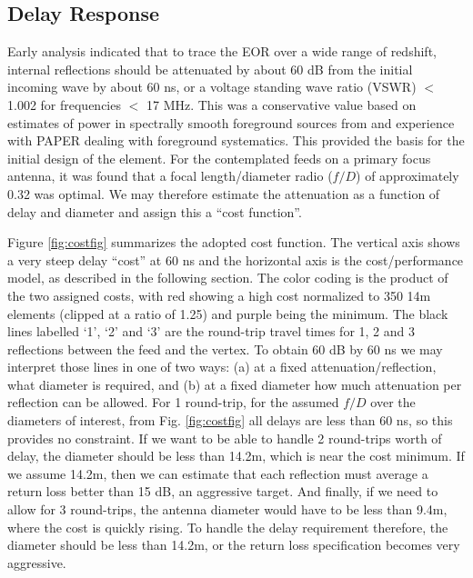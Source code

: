 \documentclass[preprint,11pt]{aastex}
\begin{document}
\subsection{Delay Response}
\label{sec:delayspec}
Early analysis \citep{elementmemo} indicated that to trace the EOR over a wide range of redshift, internal reflections should be attenuated by about 60 dB from the initial incoming wave by about 60 ns, or a voltage standing wave ratio (VSWR) $<$ 1.002 for frequencies $<$ 17 MHz.  This was a conservative value based on estimates of power in spectrally smooth foreground sources from \cite{santos_et_al2005,2008MNRAS.385.2166A, deoliveira2008, jelic_et_al2008, bernardi_et_al2010} and experience with PAPER dealing with foreground systematics.
This provided the basis for the initial design of the element.    For the contemplated feeds on a primary focus antenna, it was found that a focal length/diameter radio ($f/D$) of approximately 0.32 was optimal.  We may therefore estimate the attenuation as a function of delay and diameter and assign this a ``cost function''.  

Figure \ref{fig:costfig} summarizes the adopted cost function.  
The vertical axis shows a very steep delay ``cost'' at 60 ns and the horizontal axis is the cost/performance model, as described in the following section.  
The color coding is the product of the two assigned costs, with red showing a high cost normalized to 350 14m elements (clipped at a ratio of 1.25) and purple being the minimum.
The black lines labelled `1', `2' and `3' are the round-trip travel times for 1, 2 and 3 reflections between the feed and the vertex.
To obtain 60 dB by 60 ns we may interpret those lines in one of two ways:  
(a) at a fixed attenuation/reflection, what diameter is required, and
(b) at a fixed diameter how much attenuation per reflection can be allowed.
For 1 round-trip, for the assumed $f/D$ over the diameters of interest, from Fig. \ref{fig:costfig} all delays are less than 60 ns, so this provides no constraint.   If we want to be able to handle 2 round-trips worth of delay, the diameter should be less than 14.2m, which is near the cost minimum.  If we assume 14.2m, then we can estimate that each reflection must average a return loss better than 15 dB, an aggressive target.  And finally, if we need to allow for 3 round-trips, the antenna diameter would have to be less than 9.4m, where the cost is quickly rising.  To handle the delay requirement therefore, the diameter should be less than 14.2m, or the return loss specification becomes very aggressive.
\end{document}

